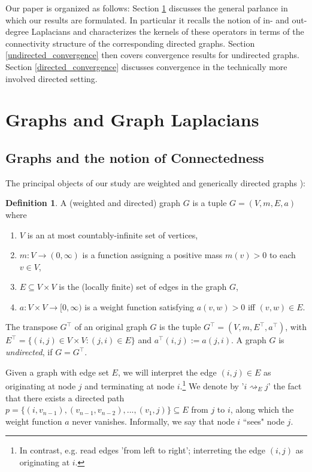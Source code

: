 \documentclass[reqno,12pt,letterpaper]{amsart}
\numberwithin{equation}{section}
\newcommand{\1}{\mathds{1}}
\theoremstyle{definition}
\newtheorem{Def}[Th]{Definition}
\begin{document}
Our paper is organized as follows: Section \ref{background} discusses the general parlance in which our results are formulated. In particular it recalls the notion of in- and out-degree Laplacians and characterizes the  kernels of these operators in terms of the connectivity structure of the corresponding directed graphs. Section \ref{undirected_convergence} then covers convergence results for undirected graphs.  Section \ref{directed_convergence} discusses convergence in the technically more involved directed setting.


	
	\section{Graphs and Graph Laplacians}\label{background}
	\subsection{Graphs and the notion of Connectedness}\label{graphs_and_connectedness}

The principal objects of our study are weighted and generically directed graphs \cite{anne2018sectoriality,balti2017, balti2017a, Huang2013SelfAdjoint, KostenkoNicolussi2023}):
	
	\begin{Def}
	A (weighted and directed) graph $G$  is a tuple $G = (V, m, E, a)$ where 
		\begin{enumerate}[label=(\roman*), topsep=0pt, itemsep=-1em]	
			\item $V$ is an at most countably-infinite set of vertices,\\
			\item $m: V \rightarrow (0, \infty)$ is a function assigning a positive mass $m(v) > 0$ to each  $v \in V$, \\
			\item 	$E \subseteq V \times V$ is the (locally finite) set  of edges in the graph $G$,\\
	\item  $a: V \times V \rightarrow [0,\infty)$ is a weight function satisfying $a(v,w) > 0$ iff $(v,w) \in E$.
	\end{enumerate}
The transpose $G^\intercal$ of an original graph $G$ is the tuple $G^\intercal = (V, m, E^{\intercal}, a^\intercal)$, with $E^{\intercal} = \{(i,j) \in V \times V: (j,i) \in E\}$ and $a^\intercal(i,j) := a(j,i)$.
A graph $G$ is \textit{undirected}, if $G = G^{\intercal}$.
		\end{Def}
Given a graph with edge set $E$, we will interpret the edge  $(i,j) \in E$ as originating at node $j$ and terminating at node $i$.\footnote{In contrast, e.g. \cite{Veerman2020APO} read edges 'from left to right'; interreting the edge  $(i,j)$  as originating at  $i$.}
We denote by '$i\rightsquigarrow_E j$' the fact that there exists a directed path $p = \{(i,v_{n-1}),(v_{n-1},v_{n-2}),..., (v_1,j)\} \subseteq E$ from $j$ to $i$, along which the weight function $a$ never vanishes. Informally, we say that  node $i$ ``sees"  node $j$.
\end{document}
